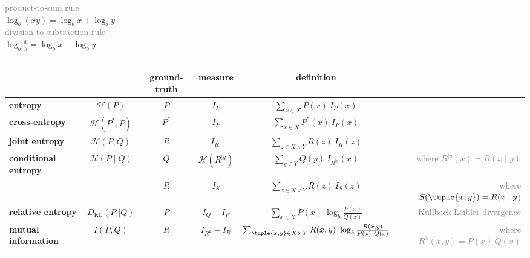 \documentclass[a4paper,fleqn,reqno,12pt,landscape]{article}
\newcommand{\mygray}[1]{\textcolor{gray}{#1}}
\newcommand{\myremark}[1]{{\footnotesize\mygray{#1}}}
\newcommand{\myrule}{\bigskip \hrule \bigskip \bigskip}
\begin{document}
\begin{paracol}{2}
\begin{minipage}[t]{0.2\linewidth}
    \myremark{product-to-sum rule}\\
    \medskip
    $\log_{b}( x y ) = \log_{b} x + \log_{b} y$
    \\
    \myremark{division-to-subtraction rule}\\
    \medskip
    $\log_{b} \frac{x}{y} = \log_{b} x - \log_{b} y$
  \end{minipage}

  \myrule

  \begin{center}
    \begin{tabular}[c]{lccccr}
      &
      & ground-truth
      & measure
      & definition
      \\ \midrule
      \textbf{entropy}
      & $\mathcal{H}(P)$
      & $P$
      & $I_{P}$
      & $ \sum_{x \in X} P(x) \ I_{P}(x)$ %
      \\ \addlinespace[0.75em]
      \textbf{cross-entropy}
      & $\mathcal{H}(P^*,P)$
      & $P^{*}$
      & $I_{P}$
      & $ \sum_{x \in X} P^{*}(x) \ I_{P}(x)$ %
      \\ \addlinespace[0.75em]
      \textbf{joint entropy}
      & $\mathcal{H}(P,Q)$
      & $R$
      & $I_{R'}$
      & $ \sum_{z \in X \times Y} R(z) \ I_{R}(z)$ %
      \\ \addlinespace[0.75em]
      \textbf{conditional entropy}
      & $\mathcal{H}(P \mid Q)$
      & $Q$
      & $\mathcal{H}(R^{\mid y})$
      & $ \sum_{y \in Y} Q(y) \ I_{R^{\mid y}}(x) $
      & \myremark{ \ \ where  $R^{\mid y}(x) = R(x \mid y)$}
      \\ \addlinespace[0.2em]
      &
      & $R$
      & $I_{S}$
      & $ \sum_{z \in X \times Y} R(z) \ I_{S}(z) $
      & \myremark{ \ \ where  $S(\tuple{x,y}) = R(x \mid y$)}
      \\ \addlinespace[0.75em]
      \textbf{relative entropy}
      & $D_{\text{KL}}(P |\!| Q)$
      & $P$
      & $I_{Q} - I_{P}$
      & $ \sum_{x \in X} P(x) \ \log_{b} \frac{P(x)}{Q(x)}$
      & \myremark{Kullback-Leibler divergence}
      \\ \addlinespace[0.75em]
      \textbf{mutual information}
      & $I(P, Q)$
      & $R$
      & $I_{R^{\Perp}} - I_{R}$
      & $ \sum_{\tuple{x,y} \in X \times Y} R(x,y) \ \log_{b} \frac{R(x,y)}{P(x)\ Q(x)}$
      & \myremark{\ \ where $R^{\Perp}(x,y) = P(x) \ Q(x)$}
      \\ \addlinespace[0.75em]
    \end{tabular}
  \end{center}
\end{paracol}
\end{document}
